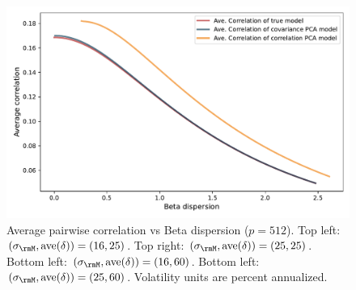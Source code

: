 \documentclass[leqno,12pt]{article}
\begin{document}
{\begin{figure}[htp]
\begin{center}
  \includegraphics[scale=0.33]{img/DispersionvsCorrelation1factorsN512T256fvol25minsvol30maxsvol90}
\end{center}
\caption{Average pairwise correlation vs Beta dispersion
($p = 512$). 
Top left: $(\sigma_\rmM, \text{ave}(\delta)) = (16,25)$.
Top right: $(\sigma_\rmM, \text{ave}(\delta)) = (25,25)$.
Bottom left: $(\sigma_\rmM, \text{ave}(\delta)) = (16,60)$.
Bottom left: $(\sigma_\rmM, \text{ave}(\delta)) = (25,60)$.
Volatility units are percent annualized.}
\end{figure}


}
\end{document}
